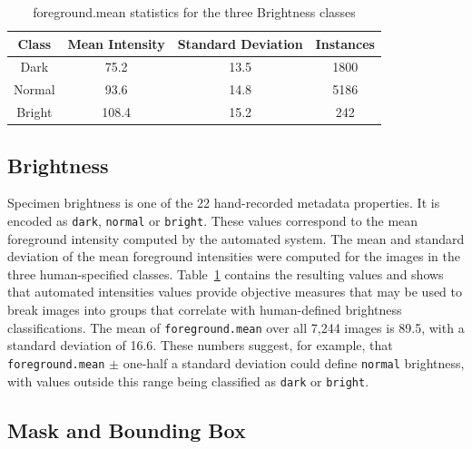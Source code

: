 \documentclass[conference]{IEEEtran}
\begin{document}
\begin{table}[H]
    \centering
    \caption{foreground.mean statistics for the three Brightness classes}
    \label{tab:bright}
    \begin{tabular}{cccc}
        \toprule
        \textbf{Class} & \textbf{Mean Intensity} & \textbf{Standard Deviation} & \textbf{Instances}\\
        \midrule
        Dark & 75.2 & 13.5 & 1800\\
        Normal & 93.6 & 14.8 & 5186\\
        Bright & 108.4 & 15.2 & 242\\
        \bottomrule
    \end{tabular}
\end{table}
\subsection{Brightness}
Specimen brightness is one of the 22 hand-recorded metadata properties. It is encoded as \verb|dark|, \verb|normal| or \verb|bright|. These values
correspond to the mean foreground intensity computed by the automated system.
The mean and standard deviation of the mean foreground intensities were
computed for the images in the three human-specified classes.
Table~\ref{tab:bright} contains the resulting values and shows that
automated intensities values provide objective measures that may be used to break images into groups that correlate with human-defined brightness
classifications.
The mean of \verb|foreground.mean| over all 7,244 images is 89.5, with a
standard deviation of 16.6. These numbers suggest, for example, that
\verb|foreground.mean| $\pm$ one-half a standard deviation could define 
\verb|normal| brightness, with values outside this range being classified
as \verb|dark| or \verb|bright|.


\subsection{Mask and Bounding Box}
\end{document}
